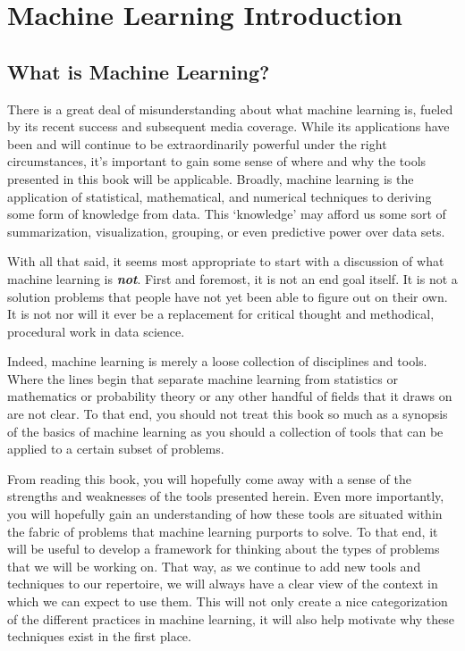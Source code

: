 \chapter{Machine Learning Introduction}

\section{What is Machine Learning?}
There is a great deal of misunderstanding about what machine learning is, fueled by its recent success and subsequent media coverage. While its applications have been and will continue to be extraordinarily powerful under the right circumstances, it's important to gain some sense of where and why the tools presented in this book will be applicable. Broadly, machine learning is the application of statistical, mathematical, and numerical techniques to deriving some form of knowledge from data. This `knowledge' may afford us some sort of summarization, visualization, grouping, or even predictive power over data sets.

With all that said, it seems most appropriate to start with a discussion of what machine learning is \textbf{\textit{not}}. First and foremost, it is not an end goal itself. It is not a solution problems that people have not yet been able to figure out on their own. It is not nor will it ever be a replacement for critical thought and methodical, procedural work in data science.

Indeed, machine learning is merely a loose collection of disciplines and tools. Where the lines begin that separate machine learning from statistics or mathematics or probability theory or any other handful of fields that it draws on are not clear. To that end, you should not treat this book so much as a synopsis of the basics of machine learning as you should a collection of tools that can be applied to a certain subset of problems.

From reading this book, you will hopefully come away with a sense of the strengths and weaknesses of the tools presented herein. Even more importantly, you will hopefully gain an understanding of how these tools are situated within the fabric of problems that machine learning purports to solve. To that end, it will be useful to develop a framework for thinking about the types of problems that we will be working on. That way, as we continue to add new tools and techniques to our repertoire, we will always have a clear view of the context in which we can expect to use them. This will not only create a nice categorization of the different practices in machine learning, it will also help motivate why these techniques exist in the first place.

